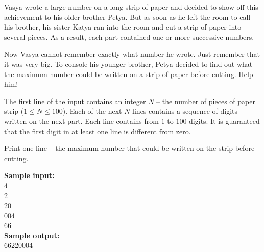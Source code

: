 \documentclass[a4paper]{article}
\begin{document}
Vasya wrote a large number on a long strip of paper and decided to show off this achievement to his older brother Petya. But as soon as he left the room to call his brother, his sister Katya ran into the room and cut a strip of paper into several pieces. As a result, each part contained one or more successive numbers.

Now Vasya cannot remember exactly what number he wrote. Just remember that it was very big. To console his younger brother, Petya decided to find out what the maximum number could be written on a strip of paper before cutting. Help him!

The first line of the input contains an integer $N$ -- the number of pieces of paper strip ($1 \le N \le 100$). Each of the next $N$ lines contains a sequence of digits written on the next part. Each line contains from $1$ to $100$ digits. It is guaranteed that the first digit in at least one line is different from zero.

Print one line -- the maximum number that could be written on the strip before cutting.

\LINE

\noindent \textbf{Sample input:}\\
4\\
2\\
20\\
004\\
66\\


\noindent \textbf{Sample output:}\\
66220004
\end{document}
